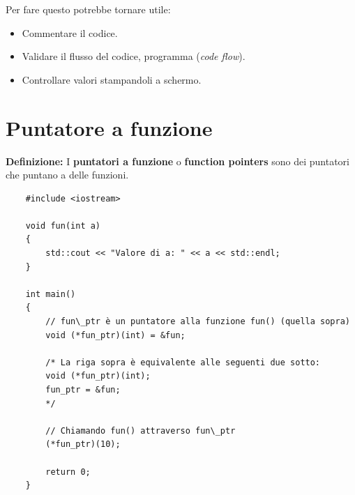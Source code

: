 \textsf{\small Per fare questo potrebbe tornare utile: } \\

\begin{itemize}
	\item \textsf{\small Commentare il codice.}
	\item \textsf{\small Validare il flusso del codice, programma (\emph{code flow}).}
	\item \textsf{\small Controllare valori stampandoli a schermo.}
\end{itemize}








\newpage

\section{Puntatore a funzione}

\textsf{\small \textbf{Definizione: } I \textbf{puntatori a funzione} o \textbf{function pointers} sono dei puntatori che puntano a delle funzioni.} \\ %

\begin{lstlisting}
	#include <iostream>
	
	void fun(int a)
	{
		std::cout << "Valore di a: " << a << std::endl;
	}
	
	int main()
	{
		// fun\_ptr è un puntatore alla funzione fun() (quella sopra)
		void (*fun_ptr)(int) = &fun;
		
		/* La riga sopra è equivalente alle seguenti due sotto:
		void (*fun_ptr)(int);
		fun_ptr = &fun;
		*/
		
		// Chiamando fun() attraverso fun\_ptr
		(*fun_ptr)(10);
		
		return 0;
	}
\end{lstlisting}

